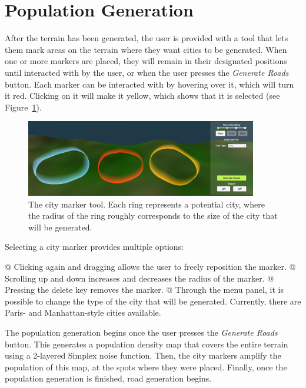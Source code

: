 \section{Population Generation}

After the terrain has been generated, the user is provided with a tool that lets them mark areas on the terrain where they want cities to be generated.
When one or more markers are placed, they will remain in their designated positions until interacted with by the user, or when the user presses the \textit{Generate Roads} button.
Each marker can be interacted with by hovering over it, which will turn it red.
Clicking on it will make it yellow, which shows that it is selected (see Figure~\ref{fig:citymarkers}). 

\begin{figure}[h!]
  \centering

  \includegraphics[width=0.9\textwidth]{figure/citymarkers.png}
  \caption{The city marker tool. Each ring represents a potential city, where the radius of the ring roughly corresponds to the size of the city that will be generated.}

  \label{fig:citymarkers}
\end{figure}

Selecting a city marker provides multiple options:
\begin{easylist}
  @ Clicking again and dragging allows the user to freely reposition the marker.
  @ Scrolling up and down increases and decreases the radius of the marker.
  @ Pressing the delete key removes the marker.
  @ Through the menu panel, it is possible to change the type of the city that will be generated. Currently, there are Paris- and Manhattan-style cities available.
\end{easylist}

The population generation begins once the user presses the \textit{Generate Roads} button.
This generates a population density map that covers the entire terrain using a 2-layered Simplex noise function.
Then, the city markers amplify the population of this map, at the spots where they were placed.
Finally, once the population generation is finished, road generation begins.
